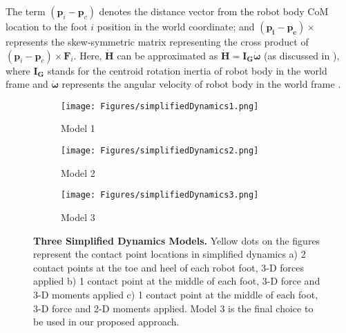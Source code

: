 The term ${(\bm p_i- \bm p_c)}$ denotes the distance vector from the robot body CoM location to the foot $i$ position in the world coordinate; and $\bm {(p_i-p_c)}\times $ represents the skew-symmetric matrix representing the cross product of ${ {(\bm p_i-\bm p_c)} \times \bm F_i }$. Here, $\bm {\dot H}$ can be approximated as $\bm{ \dot H=I_G \dot {{\omega}}}$  (as discussed in \cite{nguyen2019optimized}), where $\bm {I_G}$ stands for the centroid rotation inertia of robot body in the world frame and  $\bm {\dot {\omega}}$ represents the angular velocity of robot body in the world frame \cite{bledt2018cheetah,stephens2010push}.
	


\begin{figure}[!h]
\vspace{0.2cm}
     \centering
     \begin{subfigure}[b]{0.15\textwidth}
         \centering
         \texttt{[image: Figures/simplifiedDynamics1.png]}
         \caption{Model 1}
         \label{fig:model1}
     \end{subfigure}
     \hfill
     \begin{subfigure}[b]{0.13\textwidth}
         \centering
         \texttt{[image: Figures/simplifiedDynamics2.png]}
         \caption{Model 2}
         \label{fig:model2}
     \end{subfigure}
     \hfill
     \begin{subfigure}[b]{0.145\textwidth}
         \centering
         \texttt{[image: Figures/simplifiedDynamics3.png]}
         \caption{Model 3}
         \label{fig:model3}
     \end{subfigure}
        \caption{{\bfseries Three Simplified Dynamics Models.} Yellow dots on the figures represent the contact point locations in simplified dynamics a) 2 contact points at the toe and heel of each robot foot, 3-D forces applied  b) 1 contact point at the middle of each foot, 3-D force and 3-D moments applied  c) 1 contact point at the middle of each foot, 3-D force and 2-D moments applied. Model 3 is the final choice to be used in our proposed approach.}
        \label{fig:simplifiedDynamics}
\end{figure}

